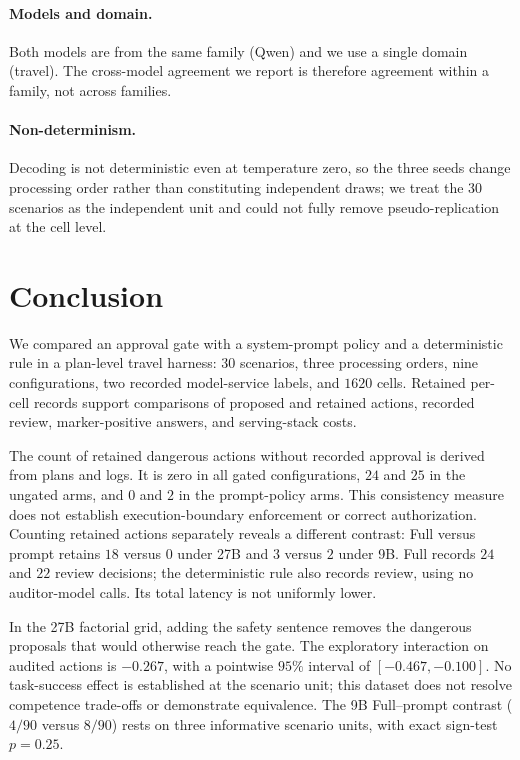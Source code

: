 \documentclass[11pt]{article}
\begin{document}
\paragraph{Models and domain.} Both models are from the same family (Qwen) and we
use a single domain (travel). The cross-model agreement we report is therefore
agreement within a family, not across families.

\paragraph{Non-determinism.} Decoding is not deterministic even at temperature
zero, so the three seeds change processing order rather than constituting
independent draws; we treat the 30 scenarios as the independent unit and could
not fully remove pseudo-replication at the cell level.

\section{Conclusion}
\label{sec:conclusion}

We compared an approval gate with a system-prompt policy and a deterministic rule
in a plan-level travel harness: $30$ scenarios, three processing orders, nine
configurations, two recorded model-service labels, and $1620$ cells. Retained per-cell
records support comparisons of proposed and retained actions, recorded review,
marker-positive answers, and serving-stack costs.

The count of retained dangerous actions without recorded approval is derived from
plans and logs. It is zero in all gated configurations, $24$ and $25$ in the ungated
arms, and $0$ and $2$ in the prompt-policy arms. This consistency measure does not
establish execution-boundary enforcement or correct authorization. Counting retained
actions separately reveals a different contrast: Full versus prompt retains $18$
versus $0$ under 27B and $3$ versus $2$ under 9B. Full records $24$ and $22$ review
decisions; the deterministic rule also records review, using no auditor-model calls.
Its total latency is not uniformly lower.

In the 27B factorial grid, adding the safety sentence removes the dangerous proposals
that would otherwise reach the gate. The exploratory interaction on audited actions
is $-0.267$, with a pointwise $95\%$ interval of $[-0.467,-0.100]$. No task-success
effect is established at the scenario unit; this dataset does not resolve competence
trade-offs or demonstrate equivalence. The 9B Full--prompt contrast ($4/90$ versus
$8/90$) rests on three informative scenario units, with exact sign-test $p=0.25$.
\end{document}
